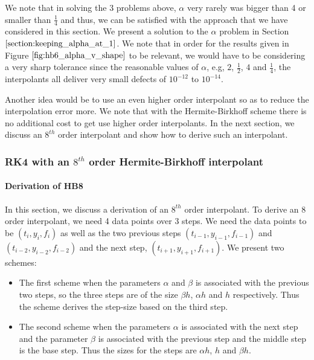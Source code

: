 \documentclass{article}
\begin{document}
We note that in solving the 3 problems above, $\alpha$ very rarely was bigger than 4 or smaller than $\frac{1}{4}$ and thus, we can be satisfied with the approach that we have considered in this section. We present a solution to the $\alpha$ problem in Section $\ref{section:keeping_alpha_at_1}$. We note that in order for the results given in Figure $\ref{fig:hb6_alpha_v_shape}$ to be relevant, we would have to be considering a very sharp tolerance since the reasonable values of $\alpha$, e.g, $2$, $\frac{1}{2}$, $4$ and $\frac{1}{4}$, the interpolants all deliver very small defects of $10^{-12}$ to $10^{-14}$.

Another idea would be to use an even higher order interpolant so as to reduce the interpolation error more. We note that with the Hermite-Birkhoff scheme there is no additional cost to get use higher order interpolants. In the next section, we discuss an $8^{th}$ order interpolant and show how to derive such an interpolant.

\subsubsection{RK4 with an $8^{th}$ order Hermite-Birkhoff interpolant}
\paragraph{Derivation of HB8}
In this section, we discuss a derivation of an $8^{th}$ order interpolant. To derive an 8 order interpolant, we need 4 data points over 3 steps. We need the data points to be $(t_i, y_i, f_i)$ as well as the two previous steps $(t_{i-1}, y_{i-1}, f_{i-1})$ and $(t_{i-2}, y_{i-2}, f_{i-2})$ and the next step, $(t_{i+1}, y_{i+1}, f_{i+1})$. We present two schemes: 
\begin{itemize}
\item The first scheme when the parameters $\alpha$ and $\beta$ is associated with the previous two steps, so the three steps are of the size $\beta h$, $\alpha h$ and $h$ respectively. Thus the scheme derives the step-size based on the third step. 

\item The second scheme when the parameters $\alpha$ is associated with the next step and the parameter $\beta$ is associated with the previous step and the middle step is the base step. Thus the sizes for the steps are $\alpha h$, $h$ and $\beta h$. 

\end{itemize}
\end{document}
